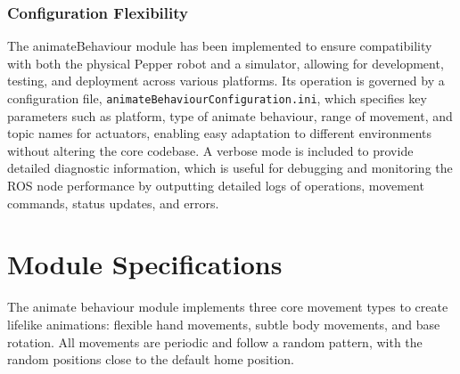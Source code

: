 \documentclass{CSSRforAfrica}
\begin{document}
\subsubsection*{Configuration Flexibility}
The animateBehaviour module has been implemented to ensure compatibility with both the physical Pepper robot and a simulator, allowing for development, testing, and deployment across various platforms. Its operation is governed by a configuration file, \texttt{animateBehaviourConfiguration.ini}, which specifies key parameters such as platform, type of animate behaviour, range of movement, and topic names for actuators, enabling easy adaptation to different environments without altering the core codebase. A verbose mode is included to provide detailed diagnostic information, which is useful for debugging and monitoring the ROS node performance by outputting detailed logs of operations, movement commands, status updates, and errors.

\newpage
\section{Module Specifications}
The animate behaviour module implements three core movement types to create lifelike animations: flexible hand movements, subtle body movements, and base rotation. All movements are periodic and follow a random pattern, with the random positions close to the default home position.
\end{document}
